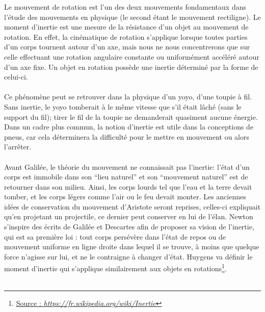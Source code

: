 Le mouvement de rotation est l'un des deux mouvements fondamentaux dans l'étude des mouvements en physique (le second étant le mouvement rectiligne). Le moment d'inertie est une mesure de la résistance d'un objet au mouvement de rotation. En effet, la cinématique de rotation s'applique lorsque toutes parties d'un corps tournent autour d'un axe, mais nous ne nous concentrerons que sur celle effectuant une rotation angulaire constante ou uniformément accéléré autour d'un axe fixe. Un objet en rotation possède une inertie déterminé par la forme de celui-ci. \\ \\
Ce phénomène peut se retrouver dans la physique d'un yoyo, d'une toupie à fil. Sans inertie, le yoyo tomberait à le même vitesse que s'il était lâché (sans le support du fil); tirer le fil de la toupie ne demanderait quasiment aucune énergie. Dans un cadre plus commun, la notion d'inertie est utile dans la conceptions de pneus, car cela déterminera la difficulté pour le mettre en mouvement ou alors l'arrêter.\\ \\
Avant Galilée, le théorie du mouvement ne connaissait pas l'inertie: l'état d'un corps est immobile dans son ``lieu naturel'' et son ``mouvement naturel'' est de retourner dans son milieu. Ainsi, les corps lourds tel que l'eau et la terre devait tomber, et les corps légers comme l'air ou le feu devait monter. Les anciennes idées de conservation du mouvement d'Aristote seront reprises, celles-ci expliquait qu'en projetant un projectile, ce dernier peut conserver en lui de l'élan. Newton s'inspire des écrits de Galilée et Descartes afin de proposer sa vision de l'inertie, qui est sa première loi : tout corps persévère dans l'état de repos ou de mouvement uniforme en ligne droite dans lequel il se trouve, à moins que quelque force n'agisse sur lui, et ne le contraigne à changer d'état. Huygens va définir le moment d'inertie qui s'applique similairement aux objets en rotations\footnote{\href{https://fr.wikipedia.org/wiki/Inertie}{Source : \textit{https://fr.wikipedia.org/wiki/Inertie}}}.\\ \\
